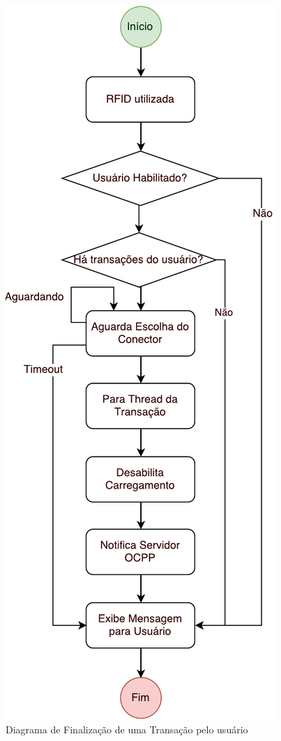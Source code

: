      \begin{figure}[H]
        \begin{center}
          \includegraphics[height=\textheight]{assets/pdfs/sw-stoptransaction.pdf}
          \caption{Diagrama de Finalização de uma Transação pelo usuário}
          \label{fig:sw-stoptransaction}
        \end{center}
      \end{figure}
